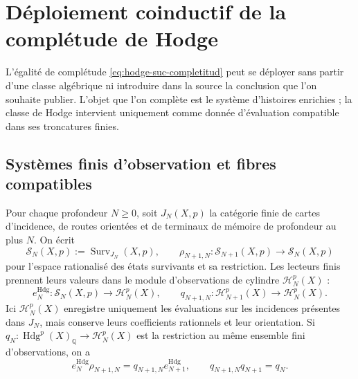 
\section{Déploiement coinductif de la complétude de Hodge}
\label{sec:amp-hodge-completitud-desplegada}

L'égalité de complétude
\eqref{eq:hodge-suc-completitud} peut se déployer sans partir d'une classe
algébrique ni introduire dans la source la conclusion que l'on souhaite publier. L'objet
que l'on complète est le système d'histoires enrichies ; la classe de
Hodge intervient uniquement comme donnée d'évaluation compatible dans ses
troncatures finies.

\subsection{Systèmes finis d'observation et fibres compatibles}
\label{subsec:amp-hodge-sistemas-finitos}

Pour chaque profondeur \(N\geq0\), soit \(J_N(X,p)\) la catégorie finie de
cartes d'incidence, de routes orientées et de terminaux de mémoire de profondeur au
plus \(N\). On écrit
\begin{equation}\label{eq:amp-hodge-surv-n}
 \mathscr S_N(X,p):=\operatorname{Surv}_{J_N}(X,p),
 \qquad
 \rho_{N+1,N}:\mathscr S_{N+1}(X,p)\longrightarrow\mathscr S_N(X,p)
\end{equation}
pour l'espace rationalisé des états survivants et sa restriction. Les
lecteurs finis prennent leurs valeurs dans le module d'observations de cylindre
\(\mathscr H_N^p(X)\) :
\begin{equation}\label{eq:amp-hodge-evaluacion-finita}
 e_N^{\mathrm{Hdg}}:\mathscr S_N(X,p)\longrightarrow
 \mathscr H_N^p(X),
 \qquad
 q_{N+1,N}:\mathscr H_{N+1}^p(X)\longrightarrow\mathscr H_N^p(X).
\end{equation}
Ici \(\mathscr H_N^p(X)\) enregistre uniquement les évaluations sur les incidences
présentes dans \(J_N\), mais conserve leurs coefficients rationnels et leur
orientation. Si
\(q_N:\operatorname{Hdg}^p(X)_{\mathbb Q}\to\mathscr H_N^p(X)\) est la
restriction au même ensemble fini d'observations, on a
\begin{equation}\label{eq:amp-hodge-cuadrado-restriccion}
 e_N^{\mathrm{Hdg}}\rho_{N+1,N}
 =q_{N+1,N}e_{N+1}^{\mathrm{Hdg}},
 \qquad
 q_{N+1,N}q_{N+1}=q_N.
\end{equation}

